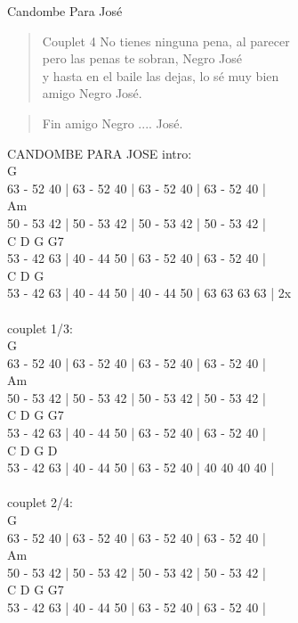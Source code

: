 \begin{song}[candombe]{Candombe Para José}
\begin{verse}{Couplet 4}
No tienes ninguna pena, al parecer\\
pero las penas te sobran, Negro José\\
y hasta en el baile las dejas, lo sé muy bien\\
amigo Negro José. \\
\end{verse}

\begin{verse}{Fin}
amigo Negro .... José. \\
\end{verse}


CANDOMBE PARA JOSE
intro:\\
G\\
63 - 52 40 | 63 - 52 40 | 63 - 52 40 | 63 - 52 40 | \\
Am\\
50 - 53 42 | 50 - 53 42 | 50 - 53 42 | 50 - 53 42 |\\
C D G G7\\
53 - 42 63 | 40 - 44 50 | 63 - 52 40 | 63 - 52 40 |\\
C D G\\
53 - 42 63 | 40 - 44 50 | 40 - 44 50 | 63 63 63 63 | 2x \\\\
couplet 1/3:\\
G\\
63 - 52 40 | 63 - 52 40 | 63 - 52 40 | 63 - 52 40 |\\
Am\\
50 - 53 42 | 50 - 53 42 | 50 - 53 42 | 50 - 53 42 |\\
C D G G7\\
53 - 42 63 | 40 - 44 50 | 63 - 52 40 | 63 - 52 40 |\\
C D G D\\
53 - 42 63 | 40 - 44 50 | 63 - 52 40 | 40 40 40 40 |\\\\
couplet 2/4:\\
G\\
63 - 52 40 | 63 - 52 40 | 63 - 52 40 | 63 - 52 40 |\\
Am\\
50 - 53 42 | 50 - 53 42 | 50 - 53 42 | 50 - 53 42 |\\
C D G G7\\
53 - 42 63 | 40 - 44 50 | 63 - 52 40 | 63 - 52 40 |\\

\end{song}
